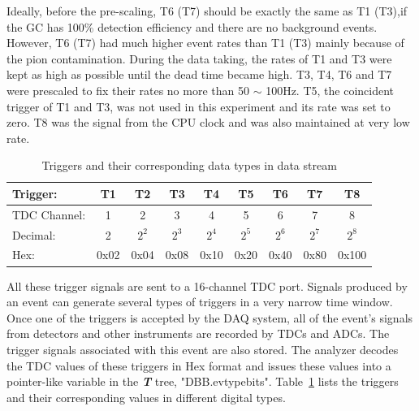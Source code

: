  Ideally, before the pre-scaling, T6 (T7) should be exactly the same as T1 (T3),if the GC has 100\% detection efficiency and there are no background events. However, T6 (T7) had much higher event rates than T1 (T3) mainly because of the pion contamination. During the data taking, the rates of  T1 and T3  were kept as high as possible until the dead time became high. T3, T4, T6 and T7 were prescaled to fix their rates no more than 50 $\sim$ 100Hz. T5, the coincident trigger of T1 and T3, was not used in this experiment and its rate was set to zero. T8 was the signal from the CPU clock and was also maintained at very low rate. 
\begin{table}[htbp]
 \begin{tabular}{lcccccccc}
 \toprule
 Trigger:       &    T1   &   T2   &   T3   &   T4   &   T5   &   T6   &   T7   &   T8\\
 \midrule
 TDC Channel:   &     1   &    2   &    3   &    4   &    5   &    6   &    7   &    8\\
 Decimal:       &     2   &   $\mathrm{2^{2}}$   &    $\mathrm{2^{3}}$   &   $\mathrm{2^{4}}$   &   $\mathrm{2^{5}}$   &  $\mathrm{2^{6}}$  &   $\mathrm{2^{7}}$  &   $\mathrm{2^{8}}$\\
 Hex:           &    0x02 &   0x04 &   0x08 &   0x10 &  0x20  &  0x40  &  0x80  &  0x100\\
 \bottomrule
 \end{tabular}
\caption{Triggers and their corresponding data types in data stream}
\label{trigger_table}
\end{table}

 All these trigger signals are sent to a 16-channel TDC port. Signals produced by an event can generate several types of triggers in a very narrow time window. Once one of the triggers is accepted by the DAQ system, all of the event's signals from detectors and other instruments are recorded by TDCs and ADCs. The trigger signals associated with this event are also stored. The analyzer decodes the TDC values of these triggers in Hex format and issues these values into a pointer-like variable in the \emph{\bf{T}} tree, "DBB.evtypebits". Table~\ref{trigger_table} lists the triggers and their corresponding values in different digital types.

